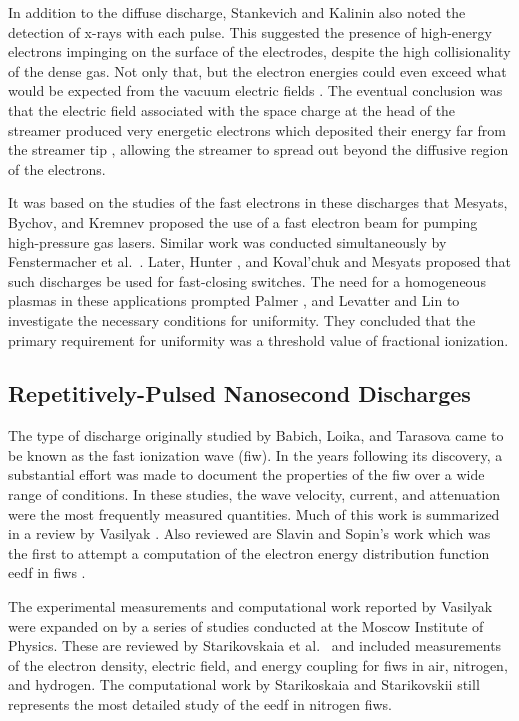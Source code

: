 In addition to the diffuse discharge, Stankevich and Kalinin also noted the
detection of x-rays with each pulse. This suggested the presence of high-energy
electrons impinging on the surface of the electrodes, despite the high
collisionality of the dense gas. Not only that, but the electron energies could
even exceed what would be expected from the vacuum electric fields
\cite{Babich1977}. The eventual conclusion was that the electric field
associated with the space charge at the head of the streamer produced very
energetic electrons which deposited their energy far from the streamer tip
\cite{Kunhardt1980, Babich1990}, allowing the streamer to spread out beyond the
diffusive region of the electrons.

It was based on the studies of the fast electrons in these discharges that
Mesyats, Bychov, and Kremnev proposed the use of a fast electron beam for
pumping high-pressure gas lasers. Similar work was conducted simultaneously by
Fenstermacher et al.~\cite{Fenstermacher1972}. Later, Hunter \cite{Hunter1976},
and Koval'chuk and Mesyats \cite{Koval'chuk1976} proposed that such discharges
be used for fast-closing switches. The need for a homogeneous plasmas in these
applications prompted Palmer \cite{Palmer1974}, and Levatter and Lin
\cite{Levatter1980} to investigate the necessary conditions for uniformity. They
concluded that the primary requirement for uniformity was a threshold value of
fractional ionization.

\subsection{Repetitively-Pulsed Nanosecond Discharges}

The type of discharge originally studied by Babich, Loika, and Tarasova came to
be known as the fast ionization wave (\acs{fiw}). In the years following its
discovery, a substantial effort was made to document the properties of the
\acs{fiw} over a wide range of conditions. In these studies, the wave velocity,
current, and attenuation were the most frequently measured quantities. Much of
this work is summarized in a review by Vasilyak \cite{Vasilyak1994}. Also
reviewed are Slavin and Sopin's work which was the first to attempt a
computation of the electron energy distribution function \acs{eedf} in
\acs{fiw}s \cite{Slavin1992}.

The experimental measurements and computational work reported by Vasilyak were
expanded on by a series of studies conducted at the Moscow Institute of Physics.
These are reviewed by Starikovskaia et al.~\cite{Starikovskaia2001} and included
measurements of the electron density, electric field, and energy coupling for
\acs{fiw}s in air, nitrogen, and hydrogen. The computational work by
Starikoskaia and Starikovskii \cite{Starikovskaia2001a} still represents the
most detailed study of the \acs{eedf} in nitrogen \acs{fiw}s.

